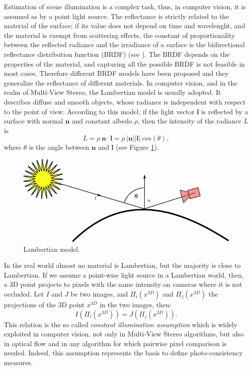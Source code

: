 Estimation of scene illumination is a complex task, thus, in computer vision, it is assumed as by a point light source.
The reflectance  is strictly related to the material of the surface;  if its value does not depend on time and wavelenght, and the material is exempt from scattering effects, the constant of proportionality between the reflected radiance and the irradiance of a surface is the bidirectional reflectance distribution function (BRDF) (see \cite{cohen2012radiosity}). 
The BRDF depends on the properties of the material, and capturing all the possible BRDF is not feasible in most cases. 
Therefore different BRDF models have been proposed and they generalize the reflectance of different materials. 
In computer vision, and in the realm of Multi-View Stereo, the Lambertian model is usually adopted. It describes diffuse and smooth objects, whose radiance is independent with respect to the point of view. 
According to this model, if the light vector $\mathbf{l}$ is reflected by a surface with normal $\mathbf{n}$ and  constant albedo $\rho$, then the intensity of the radiance $L$ is 
\begin{equation}
  L = \rho \: \mathbf{n} \cdot \mathbf{l} = \rho \: |\mathbf{n}|  |\mathbf{l}| \: cos(\theta),
\end{equation}
where $\theta$ is the angle between $\mathbf{n}$ and $\mathbf{l}$ (see Figure \ref{fig:lamber}).

\begin{figure}[t]
\includegraphics[width=0.99\columnwidth]{./img/ch_soa/lambert}
 \caption{Lambertian model.} 
\label{fig:lamber}
\end{figure}

In the real world almost no material is Lambertian, but the majority is close to Lambertian.
If we assume a point-wise light source in a Lambertian world, then, a 3D point projects to pixels with the same intensity on cameras where it is not occluded. 
Let $I$ and $J$ be two images, and $\Pi_i(x^{3D})$ and  $\Pi_j(x^{3D})$ the projections of the 3D point $x^{3D}$ in the two images, then:
\begin{equation}
 \label{eq:const_bright} 
 I(\Pi_i(x^{3D})) = J(\Pi_j(x^{3D})).
\end{equation}
This relation is the so called \emph{constant illumination assumption} which is widely exploited in computer vision, not only in Multi-View Stereo algorithms, but also in optical flow and in  any algorithm for which pairwise pixel comparison is needed.
Indeed, this assumption represents the basis to define photo-consistency measures.


